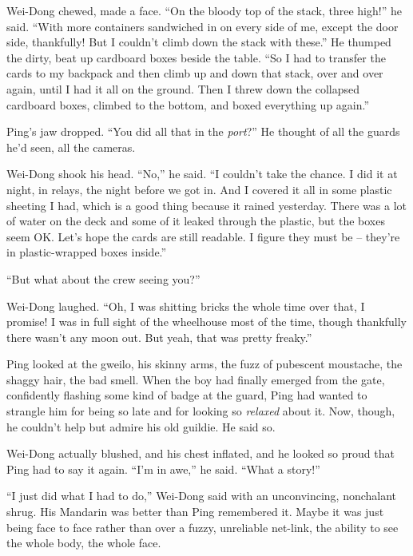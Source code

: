 Wei-Dong chewed, made a face. ``On the bloody top of the stack,
three high!'' he said. ``With more containers sandwiched in on every
side of me, except the door side, thankfully! But I couldn't climb
down the stack with these.'' He thumped the dirty, beat up cardboard
boxes beside the table. ``So I had to transfer the cards to my
backpack and then climb up and down that stack, over and over
again, until I had it all on the ground. Then I threw down the
collapsed cardboard boxes, climbed to the bottom, and boxed
everything up again.''

Ping's jaw dropped. ``You did all that in the \emph{port}?'' He
thought of all the guards he'd seen, all the cameras.

Wei-Dong shook his head. ``No,'' he said. ``I couldn't take the
chance. I did it at night, in relays, the night before we got in.
And I covered it all in some plastic sheeting I had, which is a
good thing because it rained yesterday. There was a lot of water on
the deck and some of it leaked through the plastic, but the boxes
seem OK. Let's hope the cards are still readable. I figure they
must be -- they're in plastic-wrapped boxes inside.''

``But what about the crew seeing you?''

Wei-Dong laughed. ``Oh, I was shitting bricks the whole time over
that, I promise! I was in full sight of the wheelhouse most of the
time, though thankfully there wasn't any moon out. But yeah, that
was pretty freaky.''

Ping looked at the gweilo, his skinny arms, the fuzz of pubescent
moustache, the shaggy hair, the bad smell. When the boy had finally
emerged from the gate, confidently flashing some kind of badge at
the guard, Ping had wanted to strangle him for being so late and
for looking so \emph{relaxed} about it. Now, though, he couldn't
help but admire his old guildie. He said so.

Wei-Dong actually blushed, and his chest inflated, and he looked so
proud that Ping had to say it again. ``I'm in awe,'' he said. ``What a
story!''

``I just did what I had to do,'' Wei-Dong said with an unconvincing,
nonchalant shrug. His Mandarin was better than Ping remembered it.
Maybe it was just being face to face rather than over a fuzzy,
unreliable net-link, the ability to see the whole body, the whole
face.

